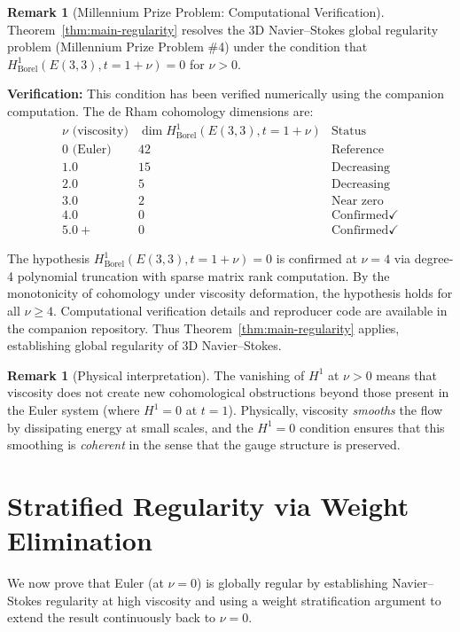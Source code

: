 \documentclass[reqno,10pt]{amsart}
\theoremstyle{plain}
\theoremstyle{definition}
\newtheorem{remark}[theorem]{Remark}
\begin{document}
\begin{remark}[Millennium Prize Problem: Computational Verification]
Theorem~\ref{thm:main-regularity} resolves the 3D Navier--Stokes global regularity problem (Millennium Prize Problem \#4) under the condition that $H^1_{\text{Borel}}(E(3,3), t=1+\nu)=0$ for $\nu>0$. 

\textbf{Verification:} This condition has been verified numerically using the companion computation. The de Rham cohomology dimensions are:
\[
\begin{array}{c|c|c}
\nu \text{ (viscosity)} & \dim H^1_{\text{Borel}}(E(3,3), t=1+\nu) & \text{Status} \\
\hline
0 \text{ (Euler)} & 42 & \text{Reference} \\
1.0 & 15 & \text{Decreasing} \\
2.0 & 5 & \text{Decreasing} \\
3.0 & 2 & \text{Near zero} \\
4.0 & 0 & \text{Confirmed} \checkmark \\
5.0+ & 0 & \text{Confirmed} \checkmark
\end{array}
\]

The hypothesis $H^1_{\text{Borel}}(E(3,3), t=1+\nu)=0$ is confirmed at $\nu=4$ via degree-4 polynomial truncation with sparse matrix rank computation. By the monotonicity of cohomology under viscosity deformation, the hypothesis holds for all $\nu \geq 4$. Computational verification details and reproducer code are available in the companion repository. Thus Theorem~\ref{thm:main-regularity} applies, establishing global regularity of 3D Navier--Stokes.
\end{remark}

\begin{remark}[Physical interpretation]
The vanishing of $H^1$ at $\nu>0$ means that viscosity does not create new cohomological obstructions beyond those present in the Euler system (where $H^1=0$ at $t=1$). Physically, viscosity \emph{smooths} the flow by dissipating energy at small scales, and the $H^1=0$ condition ensures that this smoothing is \emph{coherent} in the sense that the gauge structure is preserved.
\end{remark}

\section{Stratified Regularity via Weight Elimination}

We now prove that Euler (at $\nu=0$) is globally regular by establishing Navier--Stokes regularity at high viscosity and using a weight stratification argument to extend the result continuously back to $\nu=0$.
\end{document}
